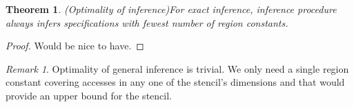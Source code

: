 \documentclass[acmlarge,review]{acmart}
\theoremstyle{definition}
\theoremstyle{plain}
\newtheorem{thm}{Theorem}
\theoremstyle{remark}
\newtheorem{remark}{Remark}
\begin{document}
\begin{thm}{(Optimality of inference)}\label{thm:inf-optimality}
  For exact inference, inference procedure always infers specifications with
  fewest number of region constants.
\end{thm}
%
\begin{proof}
  Would be nice to have.
\end{proof}

\begin{remark}{}
  Optimality of general inference is trivial. We only need a single region
  constant covering accesses in any one of the stencil's dimensions and that
  would provide an upper bound for the stencil.
\end{remark}
\end{document}
